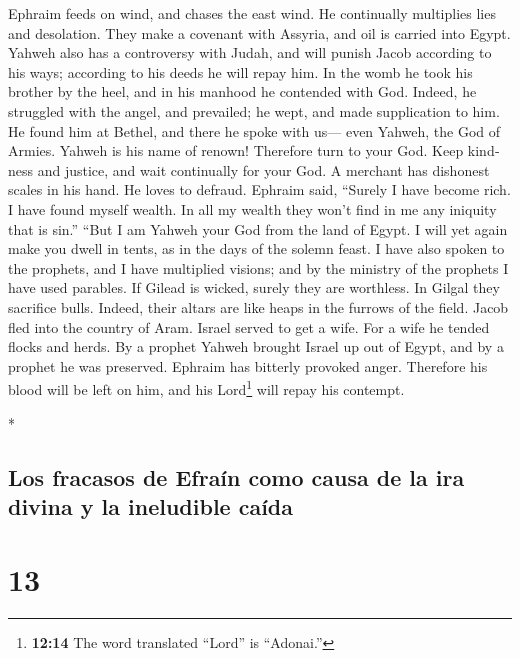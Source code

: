 \begin{paracol}{2}
\begin{otherlanguage}{english}
 Ephraim feeds on wind, and chases the east wind. He
continually multiplies lies and desolation. They make a covenant with
Assyria, and oil is carried into Egypt.  Yahweh also has a
controversy with Judah, and will punish Jacob according to his ways;
according to his deeds he will repay him.  In the womb he
took his brother by the heel, and in his manhood he contended with God.
 Indeed, he struggled with the angel, and prevailed; he
wept, and made supplication to him. He found him at Bethel, and there he
spoke with us---  even Yahweh, the God of Armies. Yahweh
is his name of renown!  Therefore turn to your God. Keep
kindness and justice, and wait continually for your God. 
A merchant has dishonest scales in his hand. He loves to defraud.
 Ephraim said, ``Surely I have become rich. I have found
myself wealth. In all my wealth they won't find in me any iniquity that
is sin.''  ``But I am Yahweh your God from the land of
Egypt. I will yet again make you dwell in tents, as in the days of the
solemn feast.  I have also spoken to the prophets, and I
have multiplied visions; and by the ministry of the prophets I have used
parables.  If Gilead is wicked, surely they are
worthless. In Gilgal they sacrifice bulls. Indeed, their altars are like
heaps in the furrows of the field.  Jacob fled into the
country of Aram. Israel served to get a wife. For a wife he tended
flocks and herds.  By a prophet Yahweh brought Israel up
out of Egypt, and by a prophet he was preserved.  Ephraim
has bitterly provoked anger. Therefore his blood will be left on him,
and his Lord\footnote{\textbf{12:14} The word translated ``Lord'' is
  ``Adonai.''} will repay his contempt.

\end{otherlanguage}

\switchcolumn[0]*

\hypertarget{los-fracasos-de-efrauxedn-como-causa-de-la-ira-divina-y-la-ineludible-cauxedda}{%
\subsection{Los fracasos de Efraín como causa de la ira divina y la
ineludible
caída}\label{los-fracasos-de-efrauxedn-como-causa-de-la-ira-divina-y-la-ineludible-cauxedda}}

\hypertarget{section-24}{%
\section{13}\label{section-24}}


\end{paracol}
